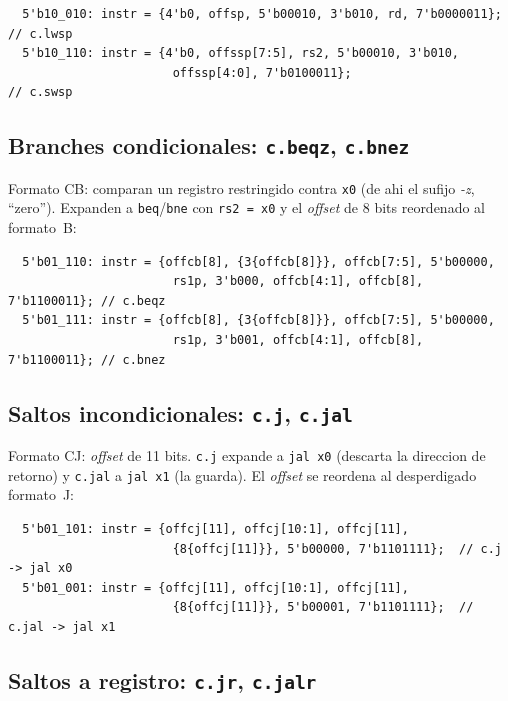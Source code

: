 \documentclass[11pt,a4paper]{article}
\begin{document}
\begin{lstlisting}
  5'b10_010: instr = {4'b0, offsp, 5'b00010, 3'b010, rd, 7'b0000011};  // c.lwsp
  5'b10_110: instr = {4'b0, offssp[7:5], rs2, 5'b00010, 3'b010,
                       offssp[4:0], 7'b0100011};                       // c.swsp
\end{lstlisting}

\subsection{Branches condicionales: \texttt{c.beqz}, \texttt{c.bnez}}

Formato CB: comparan un registro restringido contra \texttt{x0} (de ahi el
sufijo \textit{-z}, ``zero''). Expanden a \texttt{beq}/\texttt{bne} con
\texttt{rs2 = x0} y el \textit{offset} de 8 bits reordenado al formato~B:

\begin{lstlisting}
  5'b01_110: instr = {offcb[8], {3{offcb[8]}}, offcb[7:5], 5'b00000,
                       rs1p, 3'b000, offcb[4:1], offcb[8], 7'b1100011}; // c.beqz
  5'b01_111: instr = {offcb[8], {3{offcb[8]}}, offcb[7:5], 5'b00000,
                       rs1p, 3'b001, offcb[4:1], offcb[8], 7'b1100011}; // c.bnez
\end{lstlisting}

\subsection{Saltos incondicionales: \texttt{c.j}, \texttt{c.jal}}

Formato CJ: \textit{offset} de 11 bits. \texttt{c.j} expande a \texttt{jal x0}
(descarta la direccion de retorno) y \texttt{c.jal} a \texttt{jal x1} (la
guarda). El \textit{offset} se reordena al desperdigado formato~J:

\begin{lstlisting}
  5'b01_101: instr = {offcj[11], offcj[10:1], offcj[11],
                       {8{offcj[11]}}, 5'b00000, 7'b1101111};  // c.j  -> jal x0
  5'b01_001: instr = {offcj[11], offcj[10:1], offcj[11],
                       {8{offcj[11]}}, 5'b00001, 7'b1101111};  // c.jal -> jal x1
\end{lstlisting}

\subsection{Saltos a registro: \texttt{c.jr}, \texttt{c.jalr}}
\end{document}
